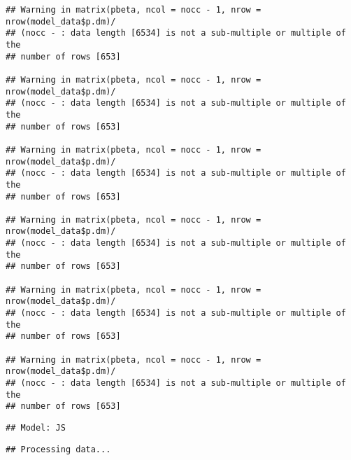 \documentclass[]{article}
\newenvironment{Shaded}{\begin{snugshade}}{\end{snugshade}}
\newcommand{\KeywordTok}[1]{\textcolor[rgb]{0.13,0.29,0.53}{\textbf{#1}}}
\newcommand{\DataTypeTok}[1]{\textcolor[rgb]{0.13,0.29,0.53}{#1}}
\newcommand{\StringTok}[1]{\textcolor[rgb]{0.31,0.60,0.02}{#1}}
\newcommand{\CommentTok}[1]{\textcolor[rgb]{0.56,0.35,0.01}{\textit{#1}}}
\newcommand{\OperatorTok}[1]{\textcolor[rgb]{0.81,0.36,0.00}{\textbf{#1}}}
\newcommand{\NormalTok}[1]{#1}
\begin{document}
\begin{verbatim}
## Warning in matrix(pbeta, ncol = nocc - 1, nrow = nrow(model_data$p.dm)/
## (nocc - : data length [6534] is not a sub-multiple or multiple of the
## number of rows [653]

## Warning in matrix(pbeta, ncol = nocc - 1, nrow = nrow(model_data$p.dm)/
## (nocc - : data length [6534] is not a sub-multiple or multiple of the
## number of rows [653]

## Warning in matrix(pbeta, ncol = nocc - 1, nrow = nrow(model_data$p.dm)/
## (nocc - : data length [6534] is not a sub-multiple or multiple of the
## number of rows [653]

## Warning in matrix(pbeta, ncol = nocc - 1, nrow = nrow(model_data$p.dm)/
## (nocc - : data length [6534] is not a sub-multiple or multiple of the
## number of rows [653]

## Warning in matrix(pbeta, ncol = nocc - 1, nrow = nrow(model_data$p.dm)/
## (nocc - : data length [6534] is not a sub-multiple or multiple of the
## number of rows [653]

## Warning in matrix(pbeta, ncol = nocc - 1, nrow = nrow(model_data$p.dm)/
## (nocc - : data length [6534] is not a sub-multiple or multiple of the
## number of rows [653]
\end{verbatim}

\begin{Shaded}
\end{Shaded}

\begin{verbatim}
## Model: JS
\end{verbatim}

\begin{verbatim}
## Processing data...
\end{verbatim}
\end{document}
